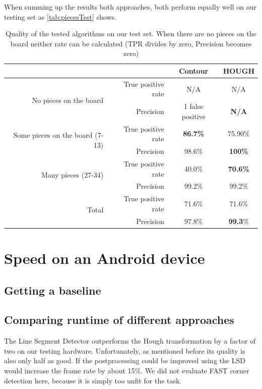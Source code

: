 	When summing up the results both approaches, both perform equally well on our testing set as \autoref{tab:piecesTest} shows.
	\begin{table}[bh]
		\begin{tabular}{|r|r||c|c|}
			\cline{3-4}
		    \multicolumn{2}{c|}{}											 		& Contour 	& HOUGH\\
			\cline{3-4}
			\hline
			\multirow{2}{*}{No pieces on the board}   		& True positive rate 	& N/A 		& N/A  \\
															& Precision			 	& 1 false positive 		& \bf{N/A} \\
			\hline
			\multirow{2}{*}{Some pieces on the board (7-13)}& True positive rate 	& \bf{86.7\%} 	& 75.90\% \\
															& Precision 			& 98.6\% 		& \bf{100\%} \\
			\hline
			\multirow{2}{*}{Many pieces (27-34)} 			& True positive rate 	& 40.0\% 		& \bf{70.6\%} \\
															& Precision			 	& 99.2\% 		& 99.2\% \\
			\hline
			\hline
			\multirow{2}{*}{Total}				 			& True positive rate 	& 71.6\% 		& 71.6\% \\
															& Precision			 	& 97.8\% 		& \textbf{99.3}\% \\
			\hline
		\end{tabular}
		\caption{Quality of the tested algorithms on our test set. When there are no pieces on the board neither rate can be calculated (TPR divides by zero, Precision becomes zero)}
		\label{tab:piecesTest}
	\end{table}





	\section{Speed on an Android device}
	\subsection{Getting a baseline}
	\subsection{Comparing runtime of different approaches}
	The Line Segment Detector outperforms the Hough transformation by a factor of two on our testing hardware. Unfortunately, as mentioned before its quality is also only half as good. If the postprocessing could be improved using the LSD would increase the frame rate by about 15\%. We did not evaluate FAST corner detection here, because it is simply too unfit for the task.

